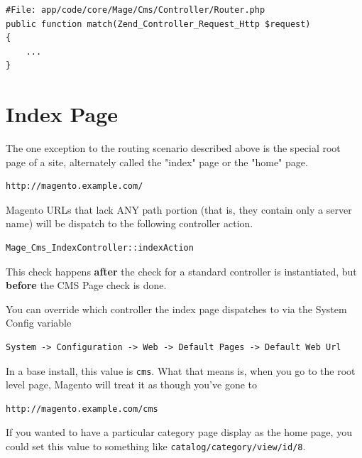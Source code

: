\documentclass[oneside]{book}
\begin{document}
\begin{lstlisting}
#File: app/code/core/Mage/Cms/Controller/Router.php
public function match(Zend_Controller_Request_Http $request)
{
    ...
}

\end{lstlisting}


\section{Index Page}

The one exception to the routing scenario described above is the special root page of a site, alternately called the "index" page or the "home" page.

\begin{lstlisting}
http://magento.example.com/

\end{lstlisting}


Magento URLs that lack ANY path portion (that is, they contain only a server name) will be dispatch to the following controller action.

\begin{lstlisting}
Mage_Cms_IndexController::indexAction

\end{lstlisting}


This check happens \textbf{after} the check for a standard controller is instantiated, but \textbf{before} the CMS Page check is done.

You can override which controller the index page dispatches to via the System Config variable

\begin{lstlisting}
System -> Configuration -> Web -> Default Pages -> Default Web Url

\end{lstlisting}


In a base install, this value is \footnotesize\texttt{cms}\normalsize.  What that means is, when you go to the root level page, Magento will treat it as though you've gone to

\begin{lstlisting}
http://magento.example.com/cms

\end{lstlisting}


If you wanted to have a particular category page display as the home page, you could set this value to something like \footnotesize\texttt{catalog/category/view/id/8}\normalsize.
\end{document}
